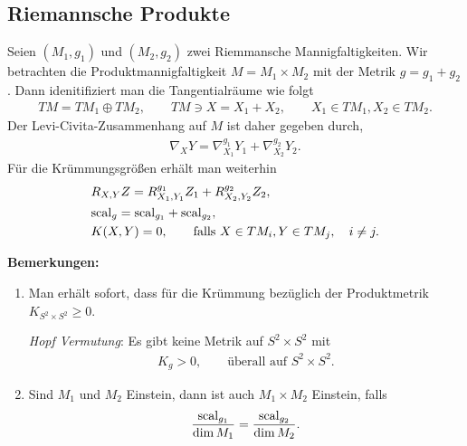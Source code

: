 \documentclass[12pt,a4paper]{article}
\begin{document}
\subsection{Riemannsche Produkte}

Seien $(M_1,g_1)$ und $(M_2,g_2)$ zwei Riemmansche Mannigfaltigkeiten. Wir
betrachten die Produktmannigfaltigkeit $M=M_1\times M_2$ mit der Metrik $g=
g_1+ g_2$. Dann idenitifiziert man die Tangentialr\"aume wie folgt
\begin{align*}
TM = TM_1\oplus TM_2,\qquad TM\ni X = X_1 + X_2,\qquad X_1\in TM_1,X_2\in TM_2.
\end{align*}
Der Levi-Civita-Zusammenhang auf $M$ ist daher gegeben durch,
\begin{align*}
\nabla_X Y = \nabla_{X_1}^{g_1}Y_1 + \nabla_{X_2}^{g_2}Y_2.
\end{align*}
F\"ur die Kr\"ummungsgr\"o\ss{}en erh\"alt man weiterhin
\begin{align*}
&R_{X,Y}Z = R_{X_1,Y_1}^{g_1}Z_1 + R_{X_2,Y_2}^{g_2}Z_2,\\
&\mathrm{scal}_g = \mathrm{scal}_{g_1} + \mathrm{scal}_{g_2},\\
&K(X,Y) = 0,\qquad \text{falls } X \in TM_i,Y\in TM_j,\quad i\neq j.
\end{align*}

{\bf Bemerkungen:}
\begin{enumerate}
  \item 
Man erh\"alt sofort, dass f\"ur die Kr\"ummung bez\"uglich der Produktmetrik
$K_{S^2\times S^2} \ge 0$.

\textit{Hopf Vermutung}: Es gibt keine Metrik auf $S^2\times S^2$ mit
\begin{align*}
K_g > 0,\qquad \text{\"uberall auf }S^2\times S^2.
\end{align*} 
\item Sind $M_1$ und $M_2$ Einstein, dann ist auch $M_1\times M_2$ Einstein,
falls
\begin{align*}
\frac{\mathrm{scal}_{g_1}}{\dim M_1} = 
\frac{\mathrm{scal}_{g_2}}{\dim M_2}.
\end{align*}
\end{enumerate}

\bigskip
\end{document}

